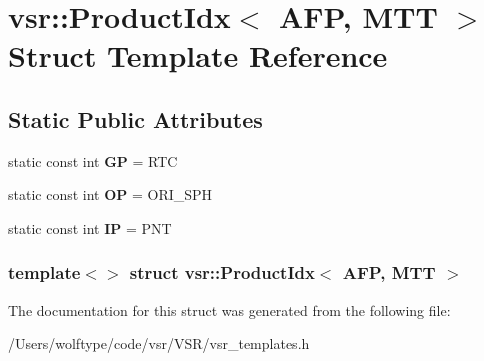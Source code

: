 \hypertarget{structvsr_1_1_product_idx_3_01_a_f_p_00_01_m_t_t_01_4}{\section{vsr\-:\-:Product\-Idx$<$ A\-F\-P, M\-T\-T $>$ Struct Template Reference}
\label{structvsr_1_1_product_idx_3_01_a_f_p_00_01_m_t_t_01_4}
}
\subsection*{Static Public Attributes}
\begin{DoxyCompactItemize}
\item 
\hypertarget{structvsr_1_1_product_idx_3_01_a_f_p_00_01_m_t_t_01_4_ac0edbc6f8a38cd77281f42ec07d6742c}{static const int {\bfseries G\-P} = R\-T\-C}\label{structvsr_1_1_product_idx_3_01_a_f_p_00_01_m_t_t_01_4_ac0edbc6f8a38cd77281f42ec07d6742c}

\item 
\hypertarget{structvsr_1_1_product_idx_3_01_a_f_p_00_01_m_t_t_01_4_ad364a80bc838855cd38fa8217b23fc81}{static const int {\bfseries O\-P} = O\-R\-I\-\_\-\-S\-P\-H}\label{structvsr_1_1_product_idx_3_01_a_f_p_00_01_m_t_t_01_4_ad364a80bc838855cd38fa8217b23fc81}

\item 
\hypertarget{structvsr_1_1_product_idx_3_01_a_f_p_00_01_m_t_t_01_4_a65d1231827b7cf502e73591b2c983247}{static const int {\bfseries I\-P} = P\-N\-T}\label{structvsr_1_1_product_idx_3_01_a_f_p_00_01_m_t_t_01_4_a65d1231827b7cf502e73591b2c983247}

\end{DoxyCompactItemize}
\subsubsection*{template$<$$>$ struct vsr\-::\-Product\-Idx$<$ A\-F\-P, M\-T\-T $>$}



The documentation for this struct was generated from the following file\-:\begin{DoxyCompactItemize}
\item 
/\-Users/wolftype/code/vsr/\-V\-S\-R/vsr\-\_\-templates.\-h\end{DoxyCompactItemize}
